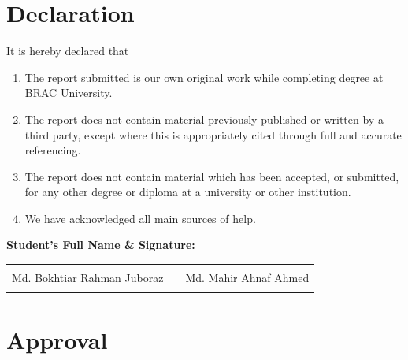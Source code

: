 \documentclass[12pt,a4paper]{report}
\begin{document}
\newpage
\thispagestyle{empty}

\chapter*{Declaration}
{}

It is hereby declared that

\begin{enumerate}
\item The report submitted is our own original work while completing degree at BRAC University.

\item The report does not contain material previously published or written by a third party, except where this is appropriately cited through full and accurate referencing.

\item The report does not contain material which has been accepted, or submitted, for any other degree or diploma at a university or other institution.

\item We have acknowledged all main sources of help.
\end{enumerate}

\vspace{2cm}

\textbf{Student's Full Name \& Signature:}

\vspace{2cm}

\begin{tabularx}{\linewidth}{@{}L{5.5cm}C{1.0cm}L{5.5cm}@{}}
\hrulefill & & \hrulefill \\
\centering Md. Bokhtiar Rahman Juboraz & & \centering Md. Mahir Ahnaf Ahmed \tabularnewline
{} & &  \tabularnewline
\end{tabularx}

\newpage
\thispagestyle{empty}

\chapter*{Approval}
{}
\end{document}
